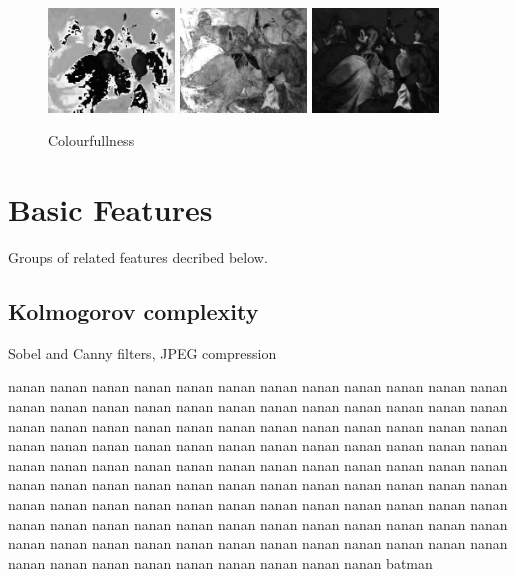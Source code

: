 \documentclass[11pt,a4paper]{report}
\begin{document}
\begin{multicols}{2}
\begin{figure}[tbp]
\centering
\includegraphics[width=0.30\textwidth]{H_caravaggio_1962_139_1}
\includegraphics[width=0.30\textwidth]{SHSV_caravaggio_1962_139_1}
\includegraphics[width=0.30\textwidth]{CS_caravaggio_1962_139_1}
\caption[Colourfullness]{Colourfullness}
\label{figcs}
\end{figure}

\section{Basic Features}

Groups of related features decribed below.

\subsection{Kolmogorov complexity}

Sobel and Canny filters, JPEG compression

nanan nanan nanan nanan nanan nanan nanan nanan nanan nanan nanan nanan nanan
nanan nanan nanan nanan nanan nanan nanan nanan nanan nanan nanan nanan nanan
nanan nanan nanan nanan nanan nanan nanan nanan nanan nanan nanan nanan nanan
nanan nanan nanan nanan nanan nanan nanan nanan nanan nanan nanan nanan nanan
nanan nanan nanan nanan nanan nanan nanan nanan nanan nanan nanan nanan nanan
nanan nanan nanan nanan nanan nanan nanan nanan nanan nanan nanan nanan nanan
nanan nanan nanan nanan nanan nanan nanan nanan nanan nanan nanan nanan nanan
nanan nanan nanan nanan nanan nanan nanan nanan nanan nanan nanan nanan nanan
nanan nanan nanan nanan nanan nanan nanan nanan nanan nanan nanan nanan nanan
batman


\end{multicols}
\end{document}
